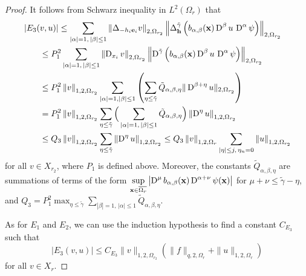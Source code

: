 \begin{proof}
It follows from Schwarz inequality in $L^2(\Omega_r)$ that
\begin{align*}
&\left| E_3(v,u) \right| \leq \sum_{|\alpha|= 1,\,|\beta|\leq 1}
\left\| \Delta_{-h_i \mathbf{e}_i} v \right\|_{2,\Omega_{r_2}}
\left\| \Delta_{\mathbf{h}}^{\tilde{\gamma}} \left(
b_{\alpha,\beta}(\mathbf{x}) \operatorname{D}^\beta u \, \operatorname{D}^\alpha \psi \right)
\right\|_{2,\Omega_{r_2}} \\
&\qquad \leq P_1^2 \sum_{|\alpha|= 1,\,|\beta|\leq 1}
\left\| \operatorname{D}_{x_i} v \right\|_{2,\Omega_{r_2}}
\left\| \operatorname{D}^{\tilde{\gamma}} \left(
b_{\alpha,\beta}(\mathbf{x}) \operatorname{D}^\beta u \, \operatorname{D}^\alpha \psi \right)
\right\|_{2,\Omega_{r_2}} \\
&\qquad \leq P_1^2
\left\| v \right\|_{1,2,\Omega_{r_2}} \sum_{|\alpha|= 1 ,|\beta|\leq 1} \left(
\sum_{\eta \leq \tilde{\gamma}} \tilde{Q}_{\alpha,\beta,\eta}
\| \operatorname{D}^{\beta+\eta} u \|_{2,\Omega_{r_2}} \right) \\
&\qquad = P_1^2 \left\|v\right\|_{1,2,\Omega_{r_2}}
\sum_{\eta \leq \tilde{\gamma}} \Big( \sum_{|\alpha|=1,\,|\beta|\leq 1}
\tilde{Q}_{\alpha,\beta,\eta} \Big)
\left\| \operatorname{D}^\eta u \right\|_{1,2,\Omega_{r_2}} \\
&\qquad \leq Q_3 \left\| v \right\|_{1,2,\Omega_{r_2}}
\sum_{\eta \leq \tilde{\gamma}} \left\| \operatorname{D}^\eta u \right\|_{1,2,\Omega_{r_2}}
\leq Q_3 \left\| v \right\|_{1,2,\Omega_r}
\sum_{|\eta| \leq j,\, \eta_n=0} \left\| u \right\|_{1,2,\Omega_{r_2}}
\end{align*}
for all $v \in X_{r_2}$, where $P_1$ is defined above.  Moreover,
the constants $\tilde{Q}_{\alpha,\beta,\eta}$ are summations of terms
of the form
$\displaystyle \sup_{\mathbf{x} \in \overline{\Omega_r}} \left|\operatorname{D}^{\mu}
b_{\alpha,\beta}(\mathbf{x})\operatorname{D}^{\alpha+\nu} \psi(\mathbf{x}) \right|$
for $\mu+\nu \leq \tilde{\gamma} - \eta$, and
$\displaystyle Q_3 = P_1^2 \max_{\eta \leq \tilde{\gamma}}
\sum_{|\beta|=1,\,|\alpha|\leq 1} \tilde{Q}_{\alpha,\beta,\eta}$.  

As for $E_1$ and $E_2$, we can use the induction
hypothesis to find a constant $C_{E_3}$ such that
\[
\left| E_3(v,u) \right| \leq C_{E_3} \|v\|_{1,2,\Omega_{r_2}}
\left( \|f\|_{q,2,\Omega_r} + \|u\|_{1,2,\Omega_r} \right)
\]
for all $v \in X_r$.


\end{proof}
